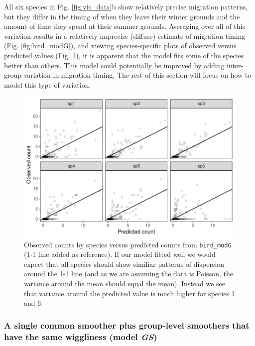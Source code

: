 \documentclass[12pt]{article}
\begin{document}
All six species in Fig. \ref{fig:vis_data}b show relatively precise
migration patterns, but they differ in the timing of when they leave
their winter grounds and the amount of time they spend at their summer
grounds. Averaging over all of this variation results in a relatively
imprecise (diffuse) estimate of migration timing (Fig.
\ref{fig:bird_modG}), and viewing species-specific plots of observed
versus predicted values (Fig. \ref{fig:bird-fitted-modG}), it is
apparent that the model fits some of the species better than others.
This model could potentially be improved by adding inter-group variation
in migration timing. The rest of this section will focus on how to model
this type of variation.

\begin{figure}
\includegraphics[width=\linewidth]{../figures/bird-fitted-modG-1} \caption{\label{fig:bird-fitted-modG}Observed counts by species versus predicted counts from \texttt{bird\_modG} (1-1 line added as reference). If our model fitted well we would expect that all species should show similiar patterns of dispersion around the 1-1 line (and as we are assuming the data is Poisson, the variance around the mean should equal the mean). Instead we see that variance around the predicted value is much higher for species 1 and 6.}\label{fig:bird-fitted-modG}
\end{figure}

\subsubsection{\texorpdfstring{A single common smoother plus group-level
smoothers that have the same wiggliness (model
\emph{GS})}{A single common smoother plus group-level smoothers that have the same wiggliness (model GS)}}\label{a-single-common-smoother-plus-group-level-smoothers-that-have-the-same-wiggliness-model-gs}
\end{document}
